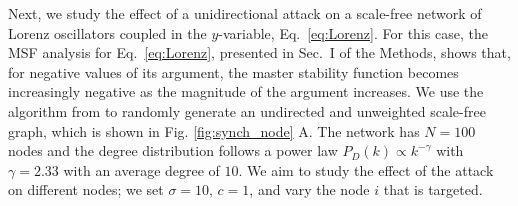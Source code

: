 \documentclass[%
 reprint,
 amsmath,amssymb,
 aip,
]{revtex4-2}
\def \bb {\pmb{b}}
\theoremstyle{italichead}
\theoremstyle{definition}
\begin{document}
{Next, we study the effect of a unidirectional attack on a scale-free network of Lorenz oscillators coupled in the $y$-variable, Eq.\ \eqref{eq:Lorenz}. {For this case, the MSF analysis for Eq.~\eqref{eq:Lorenz}, presented in Sec.\ I of the Methods, shows that, for negative values of its argument, the master stability function becomes increasingly negative as the magnitude of the argument increases.}
We use the algorithm from \cite{goh2001universal} to randomly generate an undirected and unweighted scale-free graph, which is shown in Fig. \ref{fig:synch_node} A. 
The network has $N=100$ nodes and the degree distribution follows a power law $P_D(k) \propto k^{-\gamma}$ with $\gamma = 2.33$ with an average degree of $10$.
We aim to study the effect of the attack on different nodes; we set $\sigma = 10$, $c = 1$, and vary the node $i$ that is targeted.
}
\end{document}
